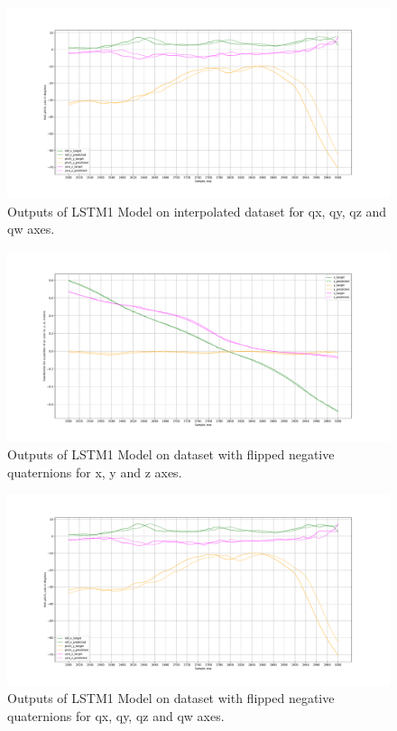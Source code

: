 \begin{figure}[htb]
	\begin{center}
		\includegraphics[width=1\textwidth, keepaspectratio]{gfx/lstm1_interpolated-roll_pitch_yaw.pdf}
		\caption{\label{fig:interp2} Outputs of LSTM1 Model on interpolated dataset for qx, qy, qz and qw axes.}
	\end{center}
\end{figure}

\begin{figure}[h]
	\begin{center}
		\includegraphics[width=1\textwidth, keepaspectratio]{gfx/lstm1_flipped-xyz_position.pdf}
		\caption{\label{fig:flip1} Outputs of LSTM1 Model on dataset with flipped negative quaternions for x, y and z axes.}
	\end{center}
\end{figure}

\begin{figure}
	\begin{center}
		\includegraphics[width=1\textwidth, keepaspectratio]{gfx/lstm1_flipped-roll_pitch_yaw.pdf}
		\caption{\label{fig:flip2} Outputs of LSTM1 Model on dataset with flipped negative quaternions for qx, qy, qz and qw axes.}
	\end{center}
\end{figure}

